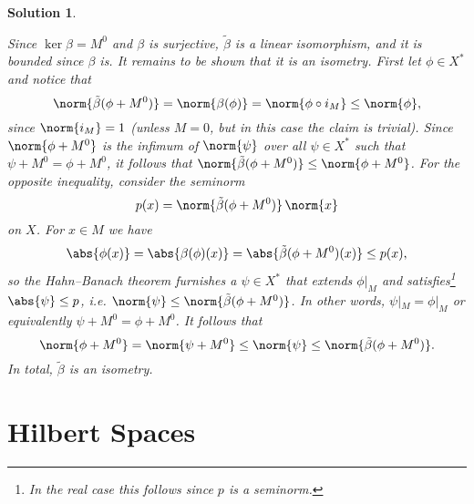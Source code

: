 \documentclass[article, a4paper, 11pt, oneside]{memoir}
\numberwithin{equation}{chapter}
\theoremstyle{nonumberplain}
\newtheorem{solution}{Solution}
\begin{document}
\begin{solution}
\begin{solutionsec}
	\item Since $\ker\beta = M^0$ and $\beta$ is surjective, $\tilde{\beta}$ is a linear isomorphism, and it is bounded since $\beta$ is. It remains to be shown that it is an isometry. First let $\phi \in X^*$ and notice that
	\begin{equation*}
		\norm{ \tilde{\beta}(\phi + M^0) }
			= \norm{\beta(\phi)}
			= \norm{\phi \circ i_M}
			\leq \norm{\phi},
	\end{equation*}
	since $\norm{i_M} = 1$ (unless $M = 0$, but in this case the claim is trivial). Since $\norm{\phi + M^0}$ is the infimum of $\norm{\psi}$ over all $\psi \in X^*$ such that $\psi + M^0 = \phi + M^0$, it follows that $\norm{ \tilde{\beta}(\phi + M^0) } \leq \norm{\phi + M^0}$. For the opposite inequality, consider the seminorm
	\begin{equation*}
		p(x) = \norm{\tilde{\beta}(\phi + M^0)} \, \norm{x}
	\end{equation*}
	on $X$. For $x \in M$ we have
	\begin{equation*}
		\abs{\phi(x)}
			= \abs{\beta(\phi)(x)}
			= \abs{\tilde{\beta}(\phi + M^0)(x)}
			\leq p(x),
	\end{equation*}
	so the Hahn--Banach theorem furnishes a $\psi \in X^*$ that extends $\phi|_M$ and satisfies\footnote{In the real case this follows since $p$ is a seminorm.} $\abs{\psi} \leq p$, i.e. $\norm{\psi} \leq \norm{\tilde{\beta}(\phi + M^0)}$. In other words, $\psi|_M = \phi|_M$ or equivalently $\psi + M^0 = \phi + M^0$. It follows that
	\begin{equation*}
		\norm{\phi + M^0}
			= \norm{\psi + M^0}
			\leq \norm{\psi}
			\leq \norm{\tilde{\beta}(\phi + M^0)}.
	\end{equation*}
	In total, $\tilde{\beta}$ is an isometry.
\end{solutionsec}
\end{solution}


\addtocounter{section}{2}
\section{Hilbert Spaces}
\end{document}
